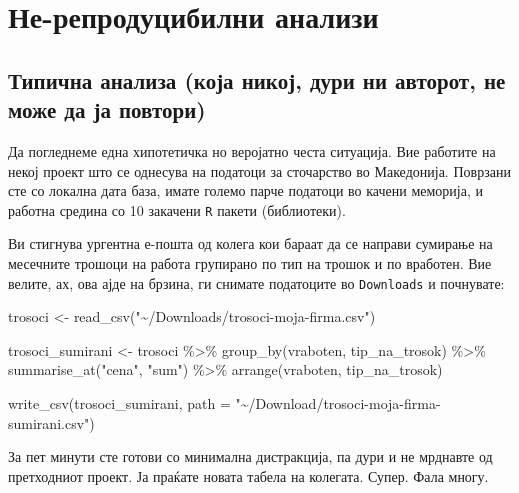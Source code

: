 \documentclass[
]{book}
\newenvironment{Shaded}{\begin{snugshade}}{\end{snugshade}}
\newcommand{\AttributeTok}[1]{\textcolor[rgb]{0.77,0.63,0.00}{#1}}
\newcommand{\FunctionTok}[1]{\textcolor[rgb]{0.00,0.00,0.00}{#1}}
\newcommand{\NormalTok}[1]{#1}
\newcommand{\OtherTok}[1]{\textcolor[rgb]{0.56,0.35,0.01}{#1}}
\newcommand{\SpecialCharTok}[1]{\textcolor[rgb]{0.00,0.00,0.00}{#1}}
\newcommand{\StringTok}[1]{\textcolor[rgb]{0.31,0.60,0.02}{#1}}
\begin{document}
\hypertarget{ux43dux435-ux440ux435ux43fux440ux43eux434ux443ux446ux438ux431ux438ux43bux43dux438-ux430ux43dux430ux43bux438ux437ux438}{%
\chapter{Не-репродуцибилни анализи}\label{ux43dux435-ux440ux435ux43fux440ux43eux434ux443ux446ux438ux431ux438ux43bux43dux438-ux430ux43dux430ux43bux438ux437ux438}}

\hypertarget{typical}{%
\section{Типична анализа (која никој, дури ни авторот, не може да ја повтори)}\label{typical}}

Да погледнеме една хипотетичка но веројатно честа ситуација. Вие работите на некој проект што се однесува на податоци за сточарство во Македонија. Поврзани сте со локална дата база, имате големо парче податоци во качени меморија, и работна средина со 10 закачени \texttt{R} пакети (библиотеки).

Ви стигнува ургентна е-пошта од колега кои бараат да се направи сумирање на месечните трошоци на работа групирано по тип на трошок и по вработен. Вие велите, ах, ова ајде на брзина, ги снимате податоците во \texttt{Downloads} и почнувате:

\begin{Shaded}
\begin{Highlighting}[]
\NormalTok{trosoci }\OtherTok{\textless{}{-}} \FunctionTok{read\_csv}\NormalTok{(}\StringTok{"\textasciitilde{}/Downloads/trosoci{-}moja{-}firma.csv"}\NormalTok{)}

\NormalTok{trosoci\_sumirani }\OtherTok{\textless{}{-}}\NormalTok{ trosoci }\SpecialCharTok{\%\textgreater{}\%} 
  \FunctionTok{group\_by}\NormalTok{(vraboten, tip\_na\_trosok) }\SpecialCharTok{\%\textgreater{}\%} 
  \FunctionTok{summarise\_at}\NormalTok{(}\StringTok{"cena"}\NormalTok{, }\StringTok{"sum"}\NormalTok{) }\SpecialCharTok{\%\textgreater{}\%} 
  \FunctionTok{arrange}\NormalTok{(vraboten, tip\_na\_trosok)}

\FunctionTok{write\_csv}\NormalTok{(trosoci\_sumirani, }
          \AttributeTok{path =} \StringTok{"\textasciitilde{}/Download/trosoci{-}moja{-}firma{-}sumirani.csv"}\NormalTok{)}
\end{Highlighting}
\end{Shaded}

За пет минути сте готови со минимална дистракција, па дури и не мрднавте од претходниот проект. Ја праќате новата табела на колегата. Супер. Фала многу.
\end{document}

